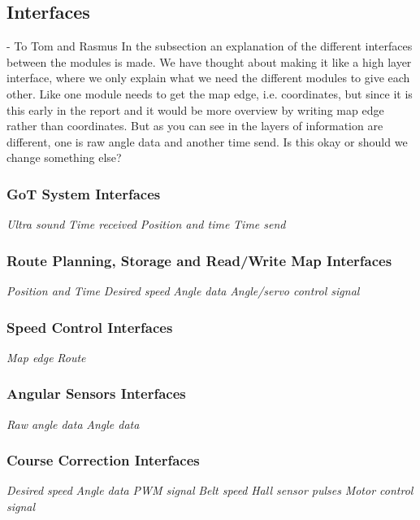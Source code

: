 \subsection{Interfaces}
- To Tom and Rasmus \newline
In the subsection an explanation of the different interfaces between the modules is made. We have thought about making it like a high layer interface, where we only explain what we need the different modules to give each other. Like one module needs to get the map edge, i.e. coordinates, but since it is this early in the report and it would be more overview by writing map edge rather than coordinates. But as you can see in  the layers of information are different, one is raw angle data and another time send. Is this okay or should we change something else?
\indent

\subsubsection{GoT System Interfaces}
\textit{Ultra sound} \textit{Time received} \textit{Position and time} \textit{Time send}

\subsubsection{Route Planning, Storage and Read/Write Map Interfaces}
\textit{Position and Time} \textit{Desired speed} \textit{Angle data} \textit{Angle/servo control signal}

\subsubsection{Speed Control Interfaces}
\textit{Map edge} \textit{Route}

\subsubsection{Angular Sensors Interfaces}
\textit{Raw angle data} \textit{Angle data}

\subsubsection{Course Correction Interfaces}
\textit{Desired speed} \textit{Angle data} \textit{PWM signal} \textit{Belt speed} \textit{Hall sensor pulses} \textit{Motor control signal}

